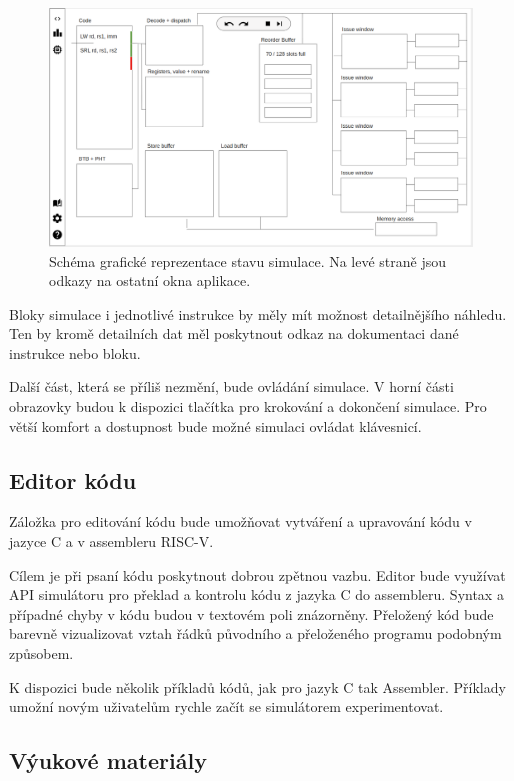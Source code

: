 \begin{figure}[ht]
    \includegraphics[width=\textwidth]{obrazky-figures/main_view_design.png}
    \caption{Schéma grafické reprezentace stavu simulace. Na levé straně jsou odkazy na ostatní okna aplikace.}
    \label{main_view_design}
\end{figure}

Bloky simulace i jednotlivé instrukce by měly mít možnost detailnějšího náhledu.
Ten by kromě detailních dat měl poskytnout odkaz na dokumentaci dané instrukce nebo bloku.

Další část, která se příliš nezmění, bude ovládání simulace.
V horní části obrazovky budou k dispozici tlačítka pro krokování a dokončení simulace.
Pro větší komfort a dostupnost bude možné simulaci ovládat klávesnicí.

\subsection{Editor kódu}

Záložka pro editování kódu bude umožňovat vytváření a upravování kódu v jazyce C a v assembleru RISC-V.

Cílem je při psaní kódu poskytnout dobrou zpětnou vazbu.
Editor bude využívat API simulátoru pro překlad a kontrolu kódu z jazyka C do assembleru.
Syntax a případné chyby v kódu budou v textovém poli znázorněny.
Přeložený kód bude barevně vizualizovat vztah řádků původního a přeloženého programu podobným způsobem. 

K dispozici bude několik příkladů kódů, jak pro jazyk C tak Assembler.
Příklady umožní novým uživatelům rychle začít se simulátorem experimentovat.

\subsection{Výukové materiály}

